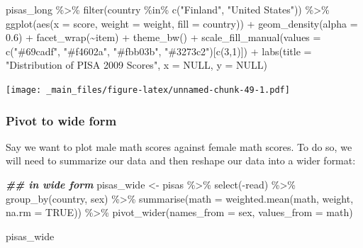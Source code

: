 \documentclass[
]{book}
\newenvironment{Shaded}{\begin{snugshade}}{\end{snugshade}}
\newcommand{\AttributeTok}[1]{\textcolor[rgb]{0.77,0.63,0.00}{#1}}
\newcommand{\ConstantTok}[1]{\textcolor[rgb]{0.00,0.00,0.00}{#1}}
\newcommand{\DecValTok}[1]{\textcolor[rgb]{0.00,0.00,0.81}{#1}}
\newcommand{\DocumentationTok}[1]{\textcolor[rgb]{0.56,0.35,0.01}{\textbf{\textit{#1}}}}
\newcommand{\FloatTok}[1]{\textcolor[rgb]{0.00,0.00,0.81}{#1}}
\newcommand{\FunctionTok}[1]{\textcolor[rgb]{0.00,0.00,0.00}{#1}}
\newcommand{\NormalTok}[1]{#1}
\newcommand{\OtherTok}[1]{\textcolor[rgb]{0.56,0.35,0.01}{#1}}
\newcommand{\SpecialCharTok}[1]{\textcolor[rgb]{0.00,0.00,0.00}{#1}}
\newcommand{\StringTok}[1]{\textcolor[rgb]{0.31,0.60,0.02}{#1}}
\begin{document}
\begin{Shaded}
\begin{Highlighting}[]
\NormalTok{pisas\_long }\SpecialCharTok{\%\textgreater{}\%} 
  \FunctionTok{filter}\NormalTok{(country }\SpecialCharTok{\%in\%} \FunctionTok{c}\NormalTok{(}\StringTok{"Finland"}\NormalTok{, }\StringTok{"United States"}\NormalTok{)) }\SpecialCharTok{\%\textgreater{}\%}
  \FunctionTok{ggplot}\NormalTok{(}\FunctionTok{aes}\NormalTok{(}\AttributeTok{x =}\NormalTok{ score, }\AttributeTok{weight =}\NormalTok{ weight, }\AttributeTok{fill =}\NormalTok{ country)) }\SpecialCharTok{+}
  \FunctionTok{geom\_density}\NormalTok{(}\AttributeTok{alpha =} \FloatTok{0.6}\NormalTok{) }\SpecialCharTok{+}
  \FunctionTok{facet\_wrap}\NormalTok{(}\SpecialCharTok{\textasciitilde{}}\NormalTok{item) }\SpecialCharTok{+}
  \FunctionTok{theme\_bw}\NormalTok{() }\SpecialCharTok{+}
  \FunctionTok{scale\_fill\_manual}\NormalTok{(}\AttributeTok{values =} \FunctionTok{c}\NormalTok{(}\StringTok{"\#69cadf"}\NormalTok{, }\StringTok{"\#f4602a"}\NormalTok{, }\StringTok{"\#fbb03b"}\NormalTok{, }\StringTok{"\#3273c2"}\NormalTok{)[}\FunctionTok{c}\NormalTok{(}\DecValTok{3}\NormalTok{,}\DecValTok{1}\NormalTok{)]) }\SpecialCharTok{+}
  \FunctionTok{labs}\NormalTok{(}\AttributeTok{title =} \StringTok{"Distribution of PISA 2009 Scores"}\NormalTok{, }\AttributeTok{x =} \ConstantTok{NULL}\NormalTok{, }\AttributeTok{y =} \ConstantTok{NULL}\NormalTok{)}
\end{Highlighting}
\end{Shaded}

\texttt{[image: \_main\_files/figure-latex/unnamed-chunk-49-1.pdf]}

\hypertarget{pivot-to-wide-form}{%
\subsubsection*{Pivot to wide form}\label{pivot-to-wide-form}}

Say we want to plot male math scores against female math scores. To do so, we will need to summarize our data and then reshape our data into a wider format:

\begin{Shaded}
\begin{Highlighting}[]
\DocumentationTok{\#\# in wide form}
\NormalTok{pisas\_wide }\OtherTok{\textless{}{-}}\NormalTok{ pisas }\SpecialCharTok{\%\textgreater{}\%} 
  \FunctionTok{select}\NormalTok{(}\SpecialCharTok{{-}}\NormalTok{read) }\SpecialCharTok{\%\textgreater{}\%} 
  \FunctionTok{group\_by}\NormalTok{(country, sex) }\SpecialCharTok{\%\textgreater{}\%} 
  \FunctionTok{summarise}\NormalTok{(}\AttributeTok{math =} \FunctionTok{weighted.mean}\NormalTok{(math, weight, }\AttributeTok{na.rm =} \ConstantTok{TRUE}\NormalTok{)) }\SpecialCharTok{\%\textgreater{}\%} 
  \FunctionTok{pivot\_wider}\NormalTok{(}\AttributeTok{names\_from =}\NormalTok{ sex, }\AttributeTok{values\_from =}\NormalTok{ math) }
  
\NormalTok{pisas\_wide}
\end{Highlighting}
\end{Shaded}
\end{document}
